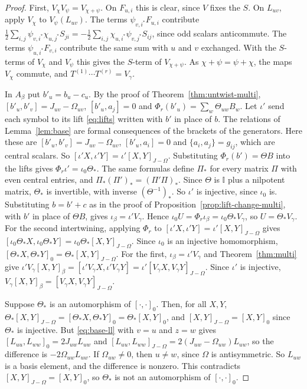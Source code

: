 \documentclass[11pt]{article}
\numberwithin{equation}{section}
\theoremstyle{definition}
\theoremstyle{remark}
\begin{document}
\begin{proof}
First, $V_\chi V_\psi=V_{\chi+\psi}$. On $F_{u,i}$ this is clear, since $V$ fixes the $S$.
On $L_{uv}$, apply $V_\chi$ to $V_\psi(L_{uv})$. The terms $\psi_{v,i^*}F_{u,i}$ contribute
$\tfrac12\sum_{i,j}\psi_{v,i^*}\chi_{u,j^*}S_{ji}=-\tfrac12\sum_{i,j}\chi_{u,i^*}\psi_{v,j^*}S_{ij}$,
since odd scalars anticommute. The terms $\psi_{u,i^*}F_{v,i}$ contribute the same sum with $u$ and $v$ exchanged. With the $S$-terms of
$V_\chi$ and $V_\psi$ this gives the $S$-term of $V_{\chi+\psi}$. As
$\chi+\psi=\psi+\chi$, the maps $V_\chi$ commute, and $T^{(1)}\cdots T^{(r)}=V_\gamma$.

In $A_\beta$ put $b'_u=b_u-c_u$. By the proof of Theorem~\ref{thm:untwist-multi},
$[b'_u,b'_v]=J_{uv}-\Omega_{uv}$, $[b'_u,a_j]=0$ and $\Phi_r(b'_u)=\sum_w\Theta_{uw}B_w$. Let $\iota'$ send
each symbol to its lift \eqref{eq:lifts} written with $b'$ in place of $b$. The relations of
Lemma~\ref{lem:base} are formal consequences of the brackets of the generators. Here these are
$[b'_u,b'_v]=J_{uv}-\Omega_{uv}$, $[b'_u,a_i]=0$ and $\{a_i,a_j\}=g_{ij}$, which are central scalars. So
$[\iota'X,\iota'Y]=\iota'[X,Y]_{J-\Omega}$. Substituting $\Phi_r(b')=\Theta B$ into the lifts gives
$\Phi_r\iota'=\iota_0\Theta_*$. The same formulas define $\Pi_*$ for every matrix $\Pi$ with even central entries, and
$\Pi_*(\Pi')_*=(\Pi'\Pi)_*$. Since $\Theta$ is $\mathbb I$ plus a nilpotent matrix, $\Theta_*$ is invertible, with inverse
$(\Theta^{-1})_*$. So
$\iota'$ is injective, since $\iota_0$ is. Substituting $b=b'+c$ as in the proof of Proposition~\ref{prop:lift-change-multi}, with
$b'$ in place of $\Theta B$, gives $\iota_\beta=\iota'V_\gamma$. Hence $\iota_0U=\Phi_r\iota_\beta=\iota_0\Theta_*V_\gamma$, so
$U=\Theta_*V_\gamma$. For the second intertwining, applying $\Phi_r$ to $[\iota'X,\iota'Y]=\iota'[X,Y]_{J-\Omega}$ gives
$[\iota_0\Theta_*X,\iota_0\Theta_*Y]=\iota_0\Theta_*[X,Y]_{J-\Omega}$. Since $\iota_0$ is an injective homomorphism,
$[\Theta_*X,\Theta_*Y]_0=\Theta_*[X,Y]_{J-\Omega}$. For the first,
$\iota_\beta=\iota'V_\gamma$ and Theorem~\ref{thm:multi} give
$\iota'V_\gamma[X,Y]_\beta=[\iota'V_\gamma X,\iota'V_\gamma Y]=\iota'[V_\gamma X,V_\gamma Y]_{J-\Omega}$. Since $\iota'$ is injective,
$V_\gamma[X,Y]_\beta=[V_\gamma X,V_\gamma Y]_{J-\Omega}$.

Suppose $\Theta_*$ is an automorphism of $[\cdot,\cdot]_0$. Then, for all $X,Y$,
$\Theta_*[X,Y]_{J-\Omega}=[\Theta_*X,\Theta_*Y]_0=\Theta_*[X,Y]_0$, and $[X,Y]_{J-\Omega}=[X,Y]_0$ since $\Theta_*$ is
injective. But \eqref{eq:base-ll} with $v=u$ and $z=w$ gives $[L_{uu},L_{ww}]_0=2J_{uw}L_{uw}$ and
$[L_{uu},L_{ww}]_{J-\Omega}=2(J_{uw}-\Omega_{uw})L_{uw}$, so the difference is $-2\Omega_{uw}L_{uw}$. If $\Omega_{uw}\neq0$, then $u\neq w$, since
$\Omega$ is antisymmetric. So $L_{uw}$ is a basis element, and the difference is nonzero. This contradicts
$[X,Y]_{J-\Omega}=[X,Y]_0$, so $\Theta_*$ is not an automorphism of $[\cdot,\cdot]_0$.
\end{proof}
\end{document}
